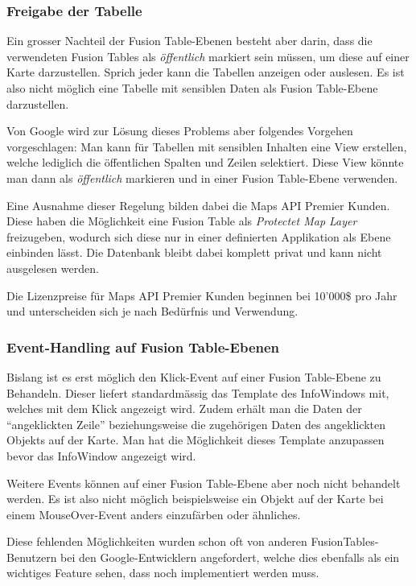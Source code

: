 \subsubsection{Freigabe der Tabelle}
Ein grosser Nachteil der Fusion Table-Ebenen besteht aber darin, dass die verwendeten Fusion Tables als  \emph{öffentlich} markiert sein müssen, um diese auf einer Karte darzustellen. Sprich jeder kann die Tabellen anzeigen oder auslesen. Es ist also nicht möglich eine Tabelle mit sensiblen Daten als Fusion Table-Ebene darzustellen.

Von Google wird zur Lösung dieses Problems aber folgendes Vorgehen vorgeschlagen: Man kann für Tabellen mit sensiblen Inhalten eine View erstellen, welche lediglich die öffentlichen Spalten und Zeilen selektiert. Diese View könnte man dann als \emph{öffentlich} markieren und in einer Fusion Table-Ebene verwenden.

Eine Ausnahme dieser Regelung bilden dabei die Maps API Premier Kunden. Diese haben die Möglichkeit eine Fusion Table als \emph{Protectet Map Layer} freizugeben, wodurch sich diese nur in einer definierten Applikation als Ebene einbinden lässt. Die Datenbank bleibt dabei komplett privat und kann nicht ausgelesen werden.

Die Lizenzpreise für Maps API Premier Kunden beginnen bei 10'000\$ pro Jahr und unterscheiden sich je nach Bedürfnis und Verwendung. 

\subsubsection{Event-Handling auf Fusion Table-Ebenen}
Bislang ist es erst möglich den Klick-Event auf einer Fusion Table-Ebene zu Behandeln. Dieser liefert standardmässig das Template des InfoWindows mit, welches mit dem Klick angezeigt wird. Zudem erhält man die Daten der "`angeklickten Zeile"' beziehungsweise die zugehörigen Daten des angeklickten Objekts auf der Karte. Man hat die Möglichkeit dieses Template anzupassen bevor das InfoWindow angezeigt wird.

Weitere Events können auf einer Fusion Table-Ebene aber noch nicht behandelt werden. Es ist also nicht möglich beispielsweise ein Objekt auf der Karte bei einem MouseOver-Event anders einzufärben oder ähnliches.

Diese fehlenden Möglichkeiten wurden schon oft von anderen FusionTables-Benutzern bei den Google-Entwicklern angefordert, welche dies ebenfalls als ein wichtiges Feature sehen, dass noch implementiert werden muss.


